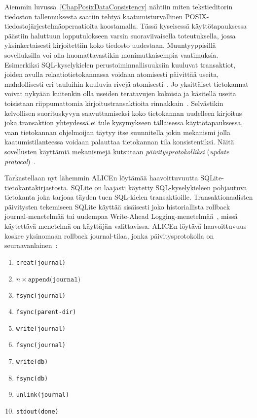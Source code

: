 Aiemmin luvussa~\ref{ChapPosixDataConsistency} nähtiin miten tekstieditorin tiedoston tallennuksesta saatiin tehtyä kaatumisturvallinen POSIX-tiedostojärjestelmäoperaatioita koostamalla.
Tässä kyseisessä käyttötapauksessa päästiin haluttuun lopputulokseen varsin suoraviivaisella toteutuksella, jossa yksinkertaisesti kirjoitettiin koko tiedosto uudestaan.
Muuntyyppisillä sovelluksilla voi olla huomattavastikin monimutkaisempia vaatimuksia.
Esimerkiksi SQL-kyselykielen perustoiminnallisuuksiin kuuluvat transaktiot,
joiden avulla relaatiotietokannassa voidaan atomisesti päivittää useita, mahdollisesti eri tauluihin kuuluvia rivejä atomisesti~\cite{DatabaseFundamentals}.
Jo yksittäiset tietokannat voivat nykyään kuitenkin olla useiden teratavujen kokoisia ja käsitellä useita toisistaan riippumattomia kirjoitustransaktioita rinnakkain~\cite{DatabaseFundamentals}.
Selvästikin kelvollisen suorituskyvyn saavuttamiseksi koko tietokannan uudelleen kirjoitus joka transaktion yhteydessä ei tule kysymykseen tällaisessa käyttötapauksessa,
vaan tietokannan ohjelmoijan täytyy itse suunnitella jokin mekanismi jolla kaatumistilanteessa voidaan palauttaa tietokannan tila konsistentiksi.
Näitä sovellusten käyttämiä mekanismejä kutsutaan \emph{päivitysprotokolliksi} (\emph{update protocol})~\cite{PosixDataConsistency}.

Tarkastellaan nyt lähemmin ALICEn löytämää haavoittuvuutta SQLite-tietokantakirjastosta.
SQLite on laajasti käytetty SQL-kyselykieleen pohjautuva tietokanta joka tarjoaa täyden tuen SQL-kielen transaktioille.
Transaktionaalisten päivitysten tekemiseen SQLite käyttää sisäisesti joko historiallista rollback journal-menetelmää tai uudempaa Write-Ahead Logging-menetelmää~\cite{SqliteAnalysis},
missä käytettävä menetelmä on käyttäjän valittavissa.
ALICEn löytävä haavoittuvuus koskee yksinomaan rollback journal-tilaa,
jonka päivitysprotokolla on seuraavanlainen~\cite{PosixDataConsistency}:

\begin{enumerate}
    \item{\texttt{creat(journal)}}
    \item{$n \times \texttt{append(journal)}$}
    \item{\texttt{fsync(journal)}}
    \item{\texttt{fsync(parent-dir)}}
    \item{\texttt{write(journal)}}
    \item{\texttt{fsync(journal)}}
    \item{\texttt{write(db)}}
    \item{\texttt{fsync(db)}}
    \item{\texttt{unlink(journal)}}
    \item{\texttt{stdout(done)}}
\end{enumerate}

